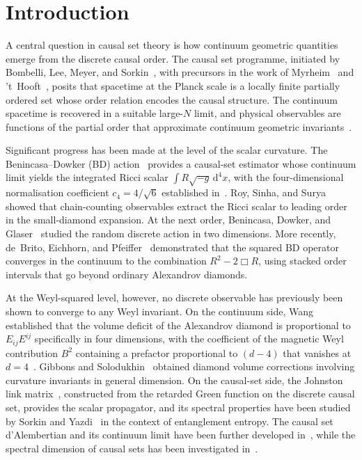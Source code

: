 \documentclass[12pt,a4paper]{article}
\theoremstyle{plain}
\theoremstyle{definition}
\theoremstyle{remark}
\newcommand{\dd}{\mathrm{d}}
\newcommand{\Esq}{E_{ij}E^{ij}}
\begin{document}
\tableofcontents
\newpage

\section{Introduction}
\label{sec:intro}

A central question in causal set theory is how continuum geometric
quantities emerge from the discrete causal order.  The causal set
programme, initiated by Bombelli, Lee, Meyer, and
Sorkin~\cite{Bombelli:1987aa}, with precursors in the work of
Myrheim~\cite{Myrheim:1978} and 't~Hooft~\cite{tHooft:1979},
posits that spacetime at the Planck scale is a locally finite
partially ordered set whose order relation encodes the causal
structure.  The continuum spacetime is recovered in a suitable
large-$N$ limit, and physical observables are functions of the
partial order that approximate continuum geometric
invariants~\cite{Surya:2019ndm,Dowker:2013,Henson:2006}.

Significant progress has been made at the level of the scalar
curvature.  The Benincasa--Dowker (BD) action~\cite{BenincasaDowker:2010}
provides a causal-set estimator whose continuum limit yields the
integrated Ricci scalar $\int R\sqrt{-g}\,\dd^4x$, with the
four-dimensional normalisation coefficient $c_4 = 4/\sqrt{6}$
established in~\cite{BenincasaDowker:2010,Belenchia:2015,Glaser:2018}.
Roy, Sinha, and Surya~\cite{RoySinhaSurya:2013} showed that
chain-counting observables extract the Ricci scalar to leading
order in the small-diamond expansion.  At the next order,
Benincasa, Dowker, and Glaser~\cite{BenincasaDowkerGlaser:2011}
studied the random discrete action in two dimensions.  More
recently, de~Brito, Eichhorn, and Pfeiffer~\cite{deBrito:2023}
demonstrated that the squared BD operator converges in the
continuum to the combination $R^2 - 2\Box R$, using stacked
order intervals that go beyond ordinary Alexandrov diamonds.

At the Weyl-squared level, however, no discrete observable has
previously been shown to converge to any Weyl invariant.  On the
continuum side, Wang~\cite{Wang:2019} established that the volume
deficit of the Alexandrov diamond is proportional
to~$\Esq$ specifically in four dimensions, with the coefficient of the magnetic Weyl contribution $B^2$
containing a prefactor proportional to $(d-4)$ that vanishes
at $d = 4$~\cite{Wang:2019}.  Gibbons and Solodukhin~\cite{GibbonsSolodukhin:2007}
obtained diamond volume corrections involving curvature invariants
in general dimension.  On the causal-set side, the Johnston
link matrix~\cite{Johnston:2008,Johnston:2010}, constructed from
the retarded Green function on the discrete causal set, provides
the scalar propagator, and its spectral properties have been
studied by Sorkin and Yazdi~\cite{Sorkin:2012,SorkinYazdi:2018}
in the context of entanglement entropy.  The causal set
d'Alembertian and its continuum limit have been further developed
in~\cite{Dowker:2010,Aslanbeigi:2014}, while the spectral
dimension of causal sets has been investigated
in~\cite{Eichhorn:2019}.
\end{document}
